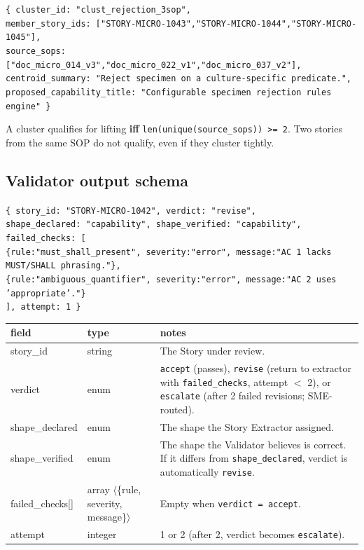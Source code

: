 \documentclass[10pt,letterpaper]{article}
\begin{document}
\noindent\texttt{\scriptsize \{ cluster\_id: "clust\_rejection\_3sop",\\
\hspace*{1em}member\_story\_ids: ["STORY-MICRO-1043","STORY-MICRO-1044","STORY-MICRO-1045"],\\
\hspace*{1em}source\_sops: ["doc\_micro\_014\_v3","doc\_micro\_022\_v1","doc\_micro\_037\_v2"],\\
\hspace*{1em}centroid\_summary: "Reject specimen on a culture-specific predicate.",\\
\hspace*{1em}proposed\_capability\_title: "Configurable specimen rejection rules engine" \}}

A cluster qualifies for lifting \textbf{iff} \texttt{len(unique(source\_sops)) >= 2}. Two stories from the same SOP do not qualify, even if they cluster tightly.

\subsection{Validator output schema}

\noindent\texttt{\scriptsize \{ story\_id: "STORY-MICRO-1042", verdict: "revise",\\
\hspace*{1em}shape\_declared: "capability", shape\_verified: "capability",\\
\hspace*{1em}failed\_checks: [\\
\hspace*{2em}\{rule:"must\_shall\_present", severity:"error", message:"AC 1 lacks MUST/SHALL phrasing."\},\\
\hspace*{2em}\{rule:"ambiguous\_quantifier", severity:"error", message:"AC 2 uses 'appropriate'."\}\\
\hspace*{1em}], attempt: 1 \}}

\begin{tabularx}{\textwidth}{@{}>{\ttfamily}p{2.6cm}p{3.0cm}X@{}}
\toprule
\textbf{field} & \textbf{type} & \textbf{notes} \\
\midrule
story\_id & string & The Story under review.\\
verdict & enum & \texttt{accept} (passes), \texttt{revise} (return to extractor with \texttt{failed\_checks}, attempt $<$ 2), or \texttt{escalate} (after 2 failed revisions; SME-routed).\\
shape\_declared & enum & The shape the Story Extractor assigned.\\
shape\_verified & enum & The shape the Validator believes is correct. If it differs from \texttt{shape\_declared}, verdict is automatically \texttt{revise}.\\
failed\_checks[] & array $\langle$\{rule, severity, message\}$\rangle$ & Empty when \texttt{verdict = accept}.\\
attempt & integer & 1 or 2 (after 2, verdict becomes \texttt{escalate}).\\
\bottomrule
\end{tabularx}
\end{document}
